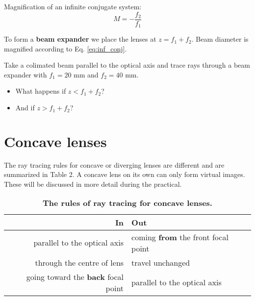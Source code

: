 \documentclass[a4paper]{report}
\newcommand{\nexercise}[0]{\arabic{exercises}\addtocounter{exercises}{1}}
\begin{document}
Magnification of an infinite conjugate system:
\begin{equation}
\label{eq:inf_conj}
	M = - \frac{f_2}{f_1}
\end{equation} 

To form a \textbf{beam expander} we place the lenses at $z = f_1 + f_2$. Beam diameter is magnified according to Eq. \ref{eq:inf_conj}.

\begin{exercisebox}[frametitle={Exercise \nexercise: Beam expander}]
Take a colimated beam parallel to the optical axis and trace rays through a beam expander with $f_1=20$ mm and $f_2=40$ mm.
\begin{itemize}
	\item What happens if $z < f_1 + f_2$?
	\item And if $z > f_1 + f_2$?
\end{itemize}
\end{exercisebox}

\section{Concave lenses}
The ray tracing rules for concave or diverging lenses are different and are summarized in Table 2. A concave lens on its own can only form virtual images. These will be discussed in more detail during the practical.

\begin{table}[b]
\centering
\begin{tabularx}{1\textwidth}{r | l}
\toprule
\textbf{In} & \textbf{Out}
\\ \midrule
parallel to the optical axis & coming \textbf{from} the front focal point \\
through the centre of lens & travel unchanged \\
going toward the \textbf{back} focal point & parallel to the optical axis \\
\bottomrule
\end{tabularx}
\label{tbl:concave}
\caption{
{\bf The rules of ray tracing for concave lenses.}}
\end{table}
\end{document}
